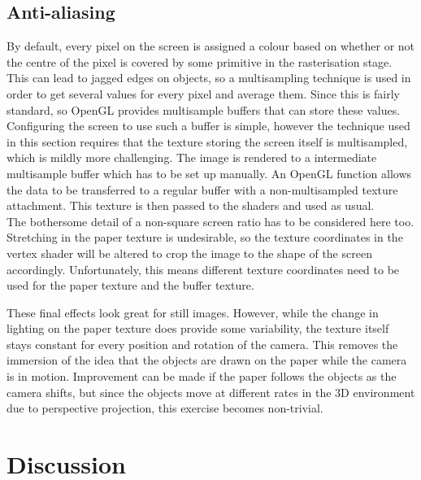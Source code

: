 \documentclass[a4paper,10pt]{article}
\begin{document}
\subsection{Anti-aliasing}
By default, every pixel on the screen is assigned a colour based on whether or not the centre of the pixel is covered by some primitive in the rasterisation stage. This can lead to jagged edges on objects, so a multisampling technique is used in order to get several values for every pixel and average them. Since this is fairly standard, so OpenGL provides multisample buffers that can store these values. Configuring the screen to use such a buffer is simple, however the technique used in this section requires that the texture storing the screen itself is multisampled, which is mildly more challenging. The image is rendered to a intermediate multisample buffer which has to be set up manually. An OpenGL function allows the data to be transferred to a regular buffer with a non-multisampled texture attachment. This texture is then passed to the shaders and used as usual.\\

The bothersome detail of a non-square screen ratio has to be considered here too. Stretching in the paper texture is undesirable, so the texture coordinates in the vertex shader will be altered to crop the image to the shape of the screen accordingly. Unfortunately, this means different texture coordinates need to be used for the paper texture and the buffer texture.

These final effects look great for still images. However, while the change in lighting on the paper texture does provide some variability, the texture itself stays constant for every position and rotation of the camera. This removes the immersion of the idea that the objects are drawn on the paper while the camera is in motion. Improvement can be made if the paper follows the objects as the camera shifts, but since the objects move at different rates in the 3D environment due to perspective projection, this exercise becomes non-trivial.



\section{Discussion}
\end{document}

